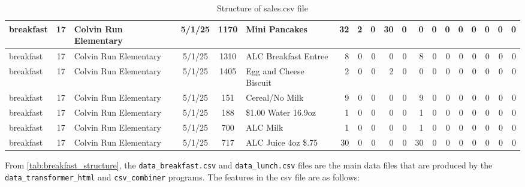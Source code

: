 \documentclass{scrartcl}
\begin{document}
\begin{landscape}
\begin{table}[H]
{\begin{tabular}{|l|c|l|c|c|l|r|r|r|r|r|r|r|r|r|r|r|r|r|}
                breakfast & 17 & Colvin Run Elementary & 5/1/25 & 1170 & Mini Pancakes & 32 & 2 & 0 & 30 & 0 & 0 & 0 & 0 & 0 & 0 & 0 & 0 & 0 \\ 
                \hline
                
                breakfast & 17 & Colvin Run Elementary & 5/1/25 & 1310 & ALC Breakfast Entree & 8 & 0 & 0 & 0 & 0 & 8 & 0 & 0 & 0 & 0 & 0 & 0 & 0 \\ 
                \hline

                breakfast & 17 & Colvin Run Elementary & 5/1/25 & 1405 & Egg and Cheese Biscuit & 2 & 0 & 0 & 2 & 0 & 0 & 0 & 0 & 0 & 0 & 0 & 0 & 0 \\ 
                \hline

                breakfast & 17 & Colvin Run Elementary & 5/1/25 & 151 & Cereal/No Milk & 9 & 0 & 0 & 0 & 0 & 9 & 0 & 0 & 0 & 0 & 0 & 0 & 0 \\
                \hline

                breakfast & 17 & Colvin Run Elementary & 5/1/25 & 188 & \$1.00 Water 16.9oz & 1 & 0 & 0 & 0 & 0 & 1 & 0 & 0 & 0 & 0 & 0 & 0 & 0 \\
                \hline
                
                breakfast & 17 & Colvin Run Elementary & 5/1/25 & 700 & ALC Milk & 1 & 0 & 0 & 0 & 0 & 1 & 0 & 0 & 0 & 0 & 0 & 0 & 0 \\
                \hline

                breakfast & 17 & Colvin Run Elementary & 5/1/25 & 717 & ALC Juice 4oz \$.75 & 30 & 0 & 0 & 0 & 0 & 30 & 0 & 0 & 0 & 0 & 0 & 0 & 0 \\
                \hline
                
            \end{tabular}
        }
        
        \caption{Structure of sales.csv file}
        \label{tab:sales_structure}
    \end{table}

    \vspace*{\fill} %
\end{landscape}

From \autoref{tab:breakfast_structure}, the \texttt{data\_breakfast.csv} and \texttt{data\_lunch.csv} files are the main data files that are produced by the \texttt{data\_transformer\_html} and \texttt{csv\_combiner} programs. The features in the csv file are as follows:
\end{document}
